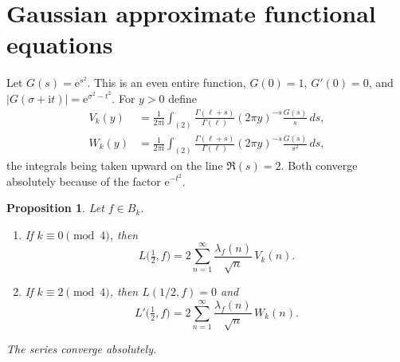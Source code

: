 \documentclass[11pt]{amsart}
\newtheorem{proposition}[theorem]{Proposition}
\theoremstyle{definition}
\theoremstyle{remark}
\numberwithin{equation}{section}
\newcommand{\ee}{\mathrm{e}}
\newcommand{\ii}{\mathrm{i}}
\begin{document}
\section{Gaussian approximate functional equations}
\label{sec:afe}

Let $G(s)=\ee^{s^2}$. This is an even entire function, $G(0)=1$, $G'(0)=0$, and $\lvert G(\sigma+\ii t)\rvert=\ee^{\sigma^2-t^2}$. For $y>0$ define
\begin{align}
V_k(y)
&=\frac{1}{2\pi\ii}\int_{(2)}
\frac{\Gamma(\ell+s)}{\Gamma(\ell)}(2\pi y)^{-s}\frac{G(s)}{s}\,ds,\label{eq:V-def}\\
W_k(y)
&=\frac{1}{2\pi\ii}\int_{(2)}
\frac{\Gamma(\ell+s)}{\Gamma(\ell)}(2\pi y)^{-s}\frac{G(s)}{s^2}\,ds,\label{eq:W-def}
\end{align}
the integrals being taken upward on the line $\Re(s)=2$. Both converge absolutely because of the factor $\ee^{-t^2}$.

\begin{proposition}\label{prop:AFE}
Let $f\in B_k$.
\begin{enumerate}[label=\rm(\roman*)]
\item If $k\equiv 0\pmod 4$, then
\begin{equation}\label{eq:AFE-plus}
L\bigl(\tfrac12,f\bigr)
=2\sum_{n=1}^\infty\frac{\lambda_f(n)}{\sqrt n}\,V_k(n).
\end{equation}
\item If $k\equiv 2\pmod 4$, then $L(1/2,f)=0$ and
\begin{equation}\label{eq:AFE-minus}
L'\bigl(\tfrac12,f\bigr)
=2\sum_{n=1}^\infty\frac{\lambda_f(n)}{\sqrt n}\,W_k(n).
\end{equation}
\end{enumerate}
The series converge absolutely.
\end{proposition}
\end{document}
